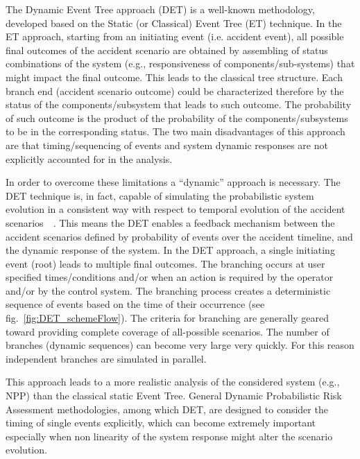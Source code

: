 \label{sec:det}
The Dynamic Event Tree approach (DET) is a well-known methodology, developed based on the Static (or Classical) Event Tree (ET) technique. In the ET approach, starting from an initiating event (i.e. accident event), all possible final outcomes of the accident scenario are obtained by assembling of status combinations of the system (e.g., responsiveness of components/sub-systems) that might impact the final outcome. This leads to the classical tree structure. Each branch end (accident scenario outcome) could be characterized therefore by the status of the components/subsystem that leads to such outcome. The probability of such outcome is the product of the probability of the components/subsystems to be in the corresponding status. The two main disadvantages of this approach are that timing/sequencing of events and system dynamic responses are not explicitly accounted for in the analysis.

In order to overcome these limitations a “dynamic” approach is necessary. The DET technique is, in fact, capable of simulating the probabilistic system evolution in a consistent way with respect to temporal evolution of the accident scenarios~\cite{alfonsiPSA}~\cite{ADAPTHakobyan}. This means the DET enables a feedback mechanism between the accident scenarios defined by probability of events over the accident timeline, and the dynamic response of the system. In the DET approach, a single initiating event (root) leads to multiple final outcomes. The branching occurs at user specified times/conditions and/or when an action is required by the operator and/or by the control system. The branching process creates a deterministic sequence of events based on the time of their occurrence (see fig.~\ref{fig:DET_schemeFlow}). The criteria for branching are generally geared toward providing complete coverage of all-possible scenarios. The number of branches (dynamic sequences) can become very large very quickly. For this reason independent branches are simulated in parallel.

This approach leads to a more realistic analysis of the considered system (e.g., NPP) than the classical static Event Tree. General Dynamic Probabilistic Risk Assessment methodologies, among which DET, are designed to consider the timing of single events explicitly, which can become extremely important especially when non linearity of the system response might alter the scenario evolution.

